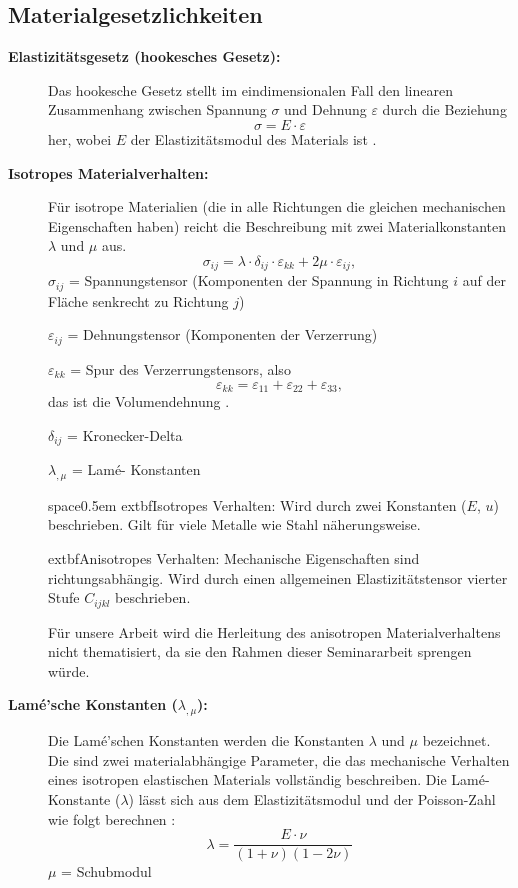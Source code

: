 \subsection{Materialgesetzlichkeiten}
\begin{description}	
	\item[\textbf{Elastizitätsgesetz (hookesches Gesetz):}] Das hookesche Gesetz stellt im eindimensionalen Fall den linearen Zusammenhang zwischen Spannung $\sigma$ und Dehnung $\varepsilon$ durch die Beziehung 
	\begin{equation}
		\sigma = 
		E \cdot \varepsilon
	\end{equation}
	her, wobei $E$ der Elastizitätsmodul des Materials ist \cite{elastomechanik:Kontinuumsmechanik}.
	\item[\textbf{Isotropes Materialverhalten:}] Für isotrope Materialien (die in alle Richtungen die gleichen mechanischen Eigenschaften haben) reicht die Beschreibung mit zwei Materialkonstanten $\lambda$ und $\mu$ aus.
	\begin{equation}
		\sigma_{ij} = 
		\lambda \cdot \delta_{ij} \cdot \varepsilon_{kk} + 2\mu \cdot \varepsilon_{ij},
	\end{equation}
	$\sigma_{ij}$ = Spannungstensor (Komponenten der Spannung in Richtung $i$ auf der Fläche senkrecht zu Richtung $j$)
	
	$\varepsilon_{ij}$ = Dehnungstensor (Komponenten der Verzerrung)
	
	$\varepsilon_{kk}$ = Spur des Verzerrungstensors, also
	\begin{equation}
		\varepsilon_{kk} =
		\varepsilon_{11} + \varepsilon_{22} + \varepsilon_{33},
	\end{equation}
	das ist die Volumendehnung \cite{elastomechanik:Grundlagen_der_Elastizitaetstheorie}.
	
	$\delta_{ij}$ = Kronecker-Delta 
	
	$\lambda_{,\mu}$ = Lamé- Konstanten
	
	
	space{0.5em}
	extbf{Isotropes Verhalten:} Wird durch zwei Konstanten ($E$, $
	u$) beschrieben. Gilt für viele Metalle wie Stahl näherungsweise.
	
	extbf{Anisotropes Verhalten:} Mechanische Eigenschaften sind richtungsabhängig. Wird durch einen allgemeinen Elastizitätstensor vierter Stufe $C_{ijkl}$ beschrieben.
	
	Für unsere Arbeit wird die Herleitung des anisotropen Materialverhaltens nicht thematisiert, da sie den Rahmen dieser Seminararbeit sprengen würde.
	\item[\textbf{Lamé’sche Konstanten ($\lambda_{,\mu}$):}] Die Lamé'schen Konstanten werden die Konstanten $\lambda$ und $\mu$ bezeichnet. 
	Die sind zwei materialabhängige Parameter, die das mechanische Verhalten eines isotropen elastischen Materials vollständig beschreiben.
	Die Lamé- Konstante ($\lambda$) lässt sich aus dem Elastizitätsmodul und der Poisson-Zahl wie folgt berechnen \cite{elastomechanik:Grundlagen_der_Elastizitaetstheorie}:
	\begin{equation}
		\lambda = 
		\frac{E \cdot \nu}{(1 + \nu)(1 - 2\nu)}
	\end{equation}
	$\mu$ = Schubmodul
	

\end{description}
